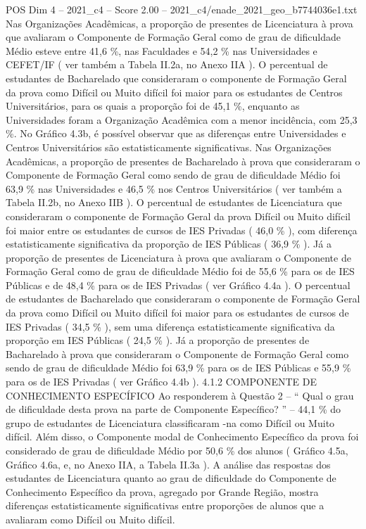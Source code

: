\begin{textsample}{POS Dim 4 – 2021\_c4 – Score 2.00 – 2021\_c4/enade\_2021\_geo\_b7744036e1.txt}
Nas Organizações Acadêmicas, a proporção de presentes de Licenciatura à prova que avaliaram o Componente de Formação Geral como de grau de dificuldade Médio esteve entre 41,6 \%, nas Faculdades e 54,2 \% nas Universidades e CEFET/IF ( ver também a Tabela II.2a, no Anexo IIA ).
O percentual de estudantes de Bacharelado que consideraram o componente de Formação Geral da prova como Difícil ou Muito difícil foi maior para os estudantes de Centros Universitários, para os quais a proporção foi de 45,1 \%, enquanto as Universidades foram a Organização Acadêmica com a menor incidência, com 25,3 \%.
No Gráfico 4.3b, é possível observar que as diferenças entre Universidades e Centros Universitários são estatisticamente significativas.
Nas Organizações Acadêmicas, a proporção de presentes de Bacharelado à prova que consideraram o Componente de Formação Geral como sendo de grau de dificuldade Médio foi 63,9 \% nas Universidades e 46,5 \% nos Centros Universitários ( ver também a Tabela II.2b, no Anexo IIB ).
O percentual de estudantes de Licenciatura que consideraram o componente de Formação Geral da prova Difícil ou Muito difícil foi maior entre os estudantes de cursos de IES Privadas ( 46,0 \% ), com diferença estatisticamente significativa da proporção de IES Públicas ( 36,9 \% ).
Já a proporção de presentes de Licenciatura à prova que avaliaram o Componente de Formação Geral como de grau de dificuldade Médio foi de 55,6 \% para os de IES Públicas e de 48,4 \% para os de IES Privadas ( ver Gráfico 4.4a ).
O percentual de estudantes de Bacharelado que consideraram o componente de Formação Geral da prova como Difícil ou Muito difícil foi maior para os estudantes de cursos de IES Privadas ( 34,5 \% ), sem uma diferença estatisticamente significativa da proporção em IES Públicas ( 24,5 \% ).
Já a proporção de presentes de Bacharelado à prova que consideraram o Componente de Formação Geral como sendo de grau de dificuldade Médio foi 63,9 \% para os de IES Públicas e 55,9 \% para os de IES Privadas ( ver Gráfico 4.4b ). 4.1.2 COMPONENTE DE CONHECIMENTO ESPECÍFICO Ao responderem à Questão 2 – “ Qual o grau de dificuldade desta prova na parte de Componente Específico? ” – 44,1 \% do grupo de estudantes de Licenciatura classificaram -na como Difícil ou Muito difícil.
Além disso, o Componente modal de Conhecimento Específico da prova foi considerado de grau de dificuldade Médio por 50,6 \% dos alunos ( Gráfico 4.5a, Gráfico 4.6a, e, no Anexo IIA, a Tabela II.3a ).
A análise das respostas dos estudantes de Licenciatura quanto ao grau de dificuldade do Componente de Conhecimento Específico da prova, agregado por Grande Região, mostra diferenças estatisticamente significativas entre proporções de alunos que a avaliaram como Difícil ou Muito difícil.

\end{textsample}
